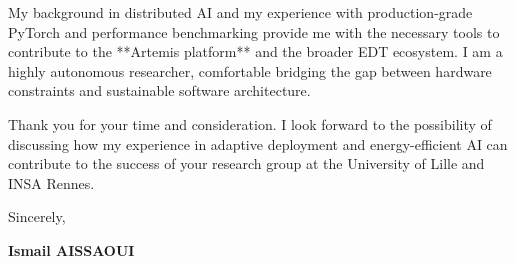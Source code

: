 \documentclass[a4paper,12pt]{article}
\begin{document}
My background in distributed AI and my experience with production-grade PyTorch and performance benchmarking provide me with the necessary tools to contribute to the **Artemis platform** and the broader EDT ecosystem. I am a highly autonomous researcher, comfortable bridging the gap between hardware constraints and sustainable software architecture.

Thank you for your time and consideration. I look forward to the possibility of discussing how my experience in adaptive deployment and energy-efficient AI can contribute to the success of your research group at the University of Lille and INSA Rennes.

Sincerely,

\bigskip

\textbf{Ismail AISSAOUI}
\end{document}
